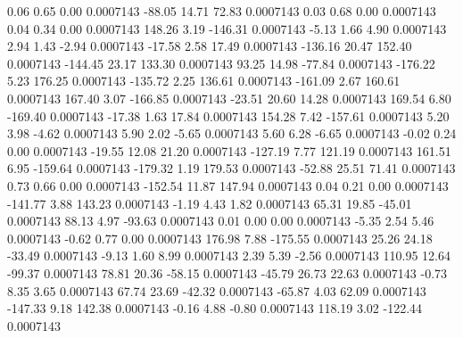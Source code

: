         0.06        0.65        0.00     0.0007143
      -88.05       14.71       72.83     0.0007143
        0.03        0.68        0.00     0.0007143
        0.04        0.34        0.00     0.0007143
      148.26        3.19     -146.31     0.0007143
       -5.13        1.66        4.90     0.0007143
        2.94        1.43       -2.94     0.0007143
      -17.58        2.58       17.49     0.0007143
     -136.16       20.47      152.40     0.0007143
     -144.45       23.17      133.30     0.0007143
       93.25       14.98      -77.84     0.0007143
     -176.22        5.23      176.25     0.0007143
     -135.72        2.25      136.61     0.0007143
     -161.09        2.67      160.61     0.0007143
      167.40        3.07     -166.85     0.0007143
      -23.51       20.60       14.28     0.0007143
      169.54        6.80     -169.40     0.0007143
      -17.38        1.63       17.84     0.0007143
      154.28        7.42     -157.61     0.0007143
        5.20        3.98       -4.62     0.0007143
        5.90        2.02       -5.65     0.0007143
        5.60        6.28       -6.65     0.0007143
       -0.02        0.24        0.00     0.0007143
      -19.55       12.08       21.20     0.0007143
     -127.19        7.77      121.19     0.0007143
      161.51        6.95     -159.64     0.0007143
     -179.32        1.19      179.53     0.0007143
      -52.88       25.51       71.41     0.0007143
        0.73        0.66        0.00     0.0007143
     -152.54       11.87      147.94     0.0007143
        0.04        0.21        0.00     0.0007143
     -141.77        3.88      143.23     0.0007143
       -1.19        4.43        1.82     0.0007143
       65.31       19.85      -45.01     0.0007143
       88.13        4.97      -93.63     0.0007143
        0.01        0.00        0.00     0.0007143
       -5.35        2.54        5.46     0.0007143
       -0.62        0.77        0.00     0.0007143
      176.98        7.88     -175.55     0.0007143
       25.26       24.18      -33.49     0.0007143
       -9.13        1.60        8.99     0.0007143
        2.39        5.39       -2.56     0.0007143
      110.95       12.64      -99.37     0.0007143
       78.81       20.36      -58.15     0.0007143
      -45.79       26.73       22.63     0.0007143
       -0.73        8.35        3.65     0.0007143
       67.74       23.69      -42.32     0.0007143
      -65.87        4.03       62.09     0.0007143
     -147.33        9.18      142.38     0.0007143
       -0.16        4.88       -0.80     0.0007143
      118.19        3.02     -122.44     0.0007143
